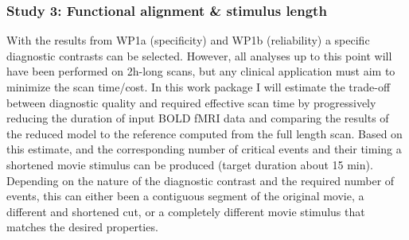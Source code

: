 \subsubsection{Study 3: Functional alignment \& stimulus length}
%
With the results from WP1a (specificity) and WP1b (reliability) a specific
diagnostic contrasts can be selected.
%
However, all analyses up to this point will have been performed on 2h-long
scans, but any clinical application must aim to minimize the scan time/cost.
%
In this work package I will estimate the trade-off between diagnostic quality
and required effective scan time by progressively reducing the duration of input
BOLD fMRI data and comparing the results of the reduced model to the reference
computed from the full length scan.
%
Based on this estimate, and the corresponding number of critical events and
their timing a shortened movie stimulus can be produced (target duration about
15 min).
%
Depending on the nature of the diagnostic contrast and the required number
of events, this can either been a contiguous segment of the original movie, a
different and shortened cut, or a completely different movie stimulus that
matches the desired properties.


